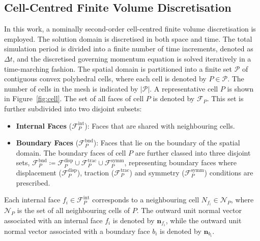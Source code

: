 \documentclass[sn-mathphys,Numbered]{sn-jnl}%
\begin{document}
\subsection{Cell-Centred Finite Volume Discretisation}
\label{sec:discretisation}
In this work, a nominally second-order cell-centred finite volume discretisation is employed.
The solution domain is discretised in both space and time.
The total simulation period is divided into a finite number of time increments, denoted as $\Delta t$, and the discretised governing momentum equation is solved iteratively in a time-marching fashion.
The spatial domain is partitioned into a finite set $\mathcal{P}$ of contiguous convex polyhedral cells, where each cell is denoted by $P \in \mathcal{P}$.
The number of cells in the mesh is indicated by $|\mathcal{P}|$.
A representative cell $P$ is shown in Figure~\ref{fig:cell}.
The set of all faces of cell $P$ is denoted by $\mathcal{F}_P$. This set is further subdivided into two disjoint subsets:
\begin{itemize}
    \item \textbf{Internal Faces} ($\mathcal{F}^{\text{int}}_P$): Faces that are shared with neighbouring cells.
    \item \textbf{Boundary Faces} ($\mathcal{F}^{\text{bnd}}_P$): Faces that lie on the boundary of the spatial domain.
    The boundary faces of cell $P$ are further classed into three disjoint sets, $\mathcal{F}^{\text{bnd}}_P \coloneqq \mathcal{F}^{\text{disp}}_P \cup \mathcal{F}^{\text{trac}}_P \cup \mathcal{F}^{\text{symm}}_P$, representing boundary faces where displacement ($\mathcal{F}^{\text{disp}}_P$), traction ($\mathcal{F}^{\text{trac}}_P$) and symmetry ($\mathcal{F}^{\text{symm}}_P$) conditions are prescribed.
\end{itemize}
Each internal face $f_i \in \mathcal{F}^{\text{int}}_P$ corresponds to a neighbouring cell $N_{f_i} \in \mathcal{N}_P$, where $\mathcal{N}_P$ is the set of all neighbouring cells of $P$. The outward unit normal vector associated with an internal face $f_i$ is denoted by $\mathbf{n}_{f_i}$, while the outward unit normal vector associated with a boundary face $b_i$ is denoted by $\mathbf{n}_{b_i}$.
\end{document}
